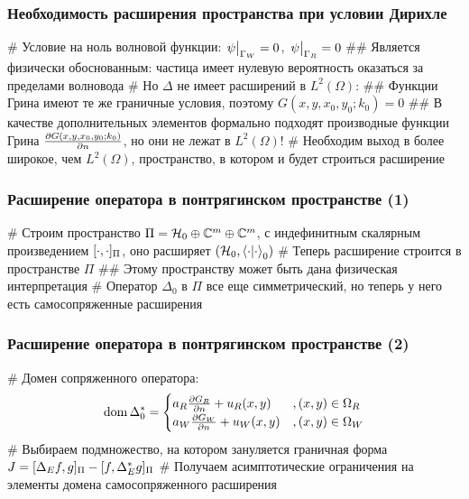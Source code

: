 \documentclass{beamer}
\begin{document}
\begin{frame}[fragile]
\frametitle{Необходимость расширения пространства при условии Дирихле}
\begin{easylist}[itemize]
# Условие на ноль волновой функции: $\eval{\psi}_{\Gamma_W} = 0$, $\eval{\psi}_{\Gamma_R} = 0$
## Является физически обоснованным: частица имеет нулевую вероятность оказаться за пределами волновода
# Но $\Delta$ не имеет расширений в $L^2(\Omega)$:
## Функции Грина имеют те же граничные условия, поэтому $G(x, y, x_0, y_0; k_0) = 0$
## В качестве дополнительных элементов формально подходят производные функции Грина $\pdv{G(x, y, x_0, y_0; k_0)}{n}$, но они не лежат в $L^2(\Omega)$!
# Необходим выход в более широкое, чем $L^2(\Omega)$, пространство, в котором и будет строиться расширение
\end{easylist}
\end{frame}

\begin{frame}[fragile]
\frametitle{Расширение оператора в понтрягинском пространстве (1)}
\begin{easylist}[itemize]
# Строим пространство $\Pi = \mathcal{H}_{0} \oplus \mathbb{C}^m \oplus \mathbb{C}^m$, с индефинитным скалярным произведением $[\cdot,\cdot]_\Pi$, оно расширяет $(\hilb{0}, \ip{\cdot}{\cdot}_0)$
# Теперь расширение строится в пространстве $\Pi$
## Этому пространству может быть дана физическая интерпретация
# Оператор $\Delta_0$ в $\Pi$ все еще симметрический, но теперь у него есть самосопряженные расширения
\end{easylist}
\end{frame}

\begin{frame}[fragile]
\frametitle{Расширение оператора в понтрягинском пространстве (2)}
\begin{easylist}[itemize]
# Домен сопряженного оператора:
\[
\operatorname{dom} \Delta_0^* =
\begin{cases}
a_R \pdv{G_R}{n} (x, y, x_0, y_0; k_0) + u_R(x, y) &, (x, y) \in \Omega_R \\
a_W \pdv{G_W}{n} (x, y, x_0, y_0; k_0) + u_W(x, y) &, (x, y) \in \Omega_W
\end{cases}
\]
# Выбираем подмножество, на котором зануляется граничная форма $J =  [\Delta_E f,g]_\Pi - [f,\Delta_E^* g]_\Pi$
# Получаем асимптотические ограничения на элементы домена самосопряженного расширения
\end{easylist}
\end{frame}
\end{document}
